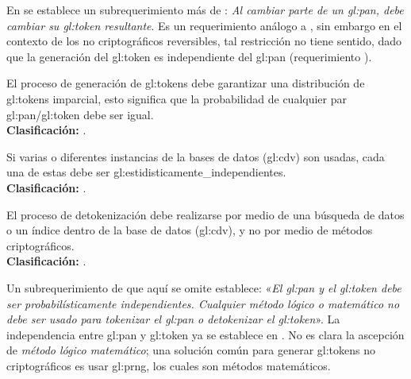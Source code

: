 En \cite{pci_tokens} se establece un subrequerimiento más de
: \textit{Al cambiar parte de un
\gls{gl:pan}, debe cambiar su \gls{gl:token} resultante}. Es un requerimiento
análogo a , sin embargo en el contexto
de los  no criptográficos reversibles, tal restricción no tiene sentido, dado
que  la generación del \gls{gl:token} es independiente del \gls{gl:pan}
(requerimiento ).

{
  El proceso de generación de \glspl{gl:token} debe garantizar una
  distribución de \glspl{gl:token} imparcial, esto significa que la
  probabilidad de cualquier par \gls{gl:pan}/\gls{gl:token} debe ser igual. \\
  \nopagebreak[4]
  \textbf{Clasificación:} .
}

{
  Si varias o diferentes instancias de la bases de datos (\gls{gl:cdv}) son
  usadas, cada una de estas debe ser
  \glspl{gl:estidisticamente_independiente}. \\
  \nopagebreak[4]
  \textbf{Clasificación:} .
}

{
  El proceso de detokenización debe realizarse por medio de una búsqueda de
  datos o un índice dentro de la base de datos (\gls{gl:cdv}), y no por medio
  de métodos criptográficos. \\
  \nopagebreak[4]
  \textbf{Clasificación:} .

}

Un subrequerimiento de  que
aquí se omite establece: «\textit{El \gls{gl:pan} y el \gls{gl:token} debe ser
probabilísticamente independientes. Cualquier método lógico o matemático no
debe ser usado para \textit{tokenizar} el \gls{gl:pan} o \textit{detokenizar}
el \gls{gl:token}}». La independencia entre \gls{gl:pan} y \gls{gl:token} ya
se establece en . No es
clara la ascepción de \textit{método lógico matemático}; una solución
común para generar \glspl{gl:token} no criptográficos es usar \gls{gl:prng},
los cuales son métodos matemáticos.

